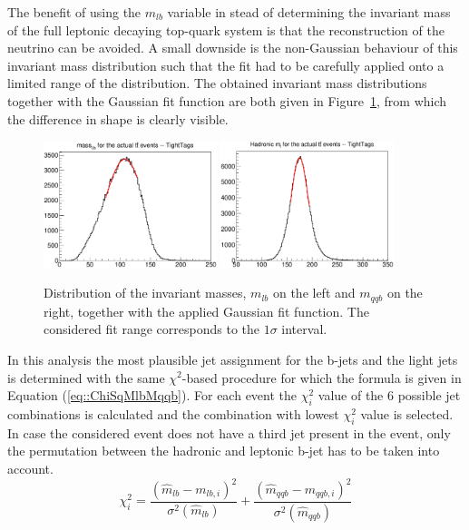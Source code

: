 The benefit of using the $m_{lb}$ variable in stead of determining the invariant mass of the full leptonic decaying top-quark system is that the reconstruction of the neutrino can be avoided.
A small downside is the non-Gaussian behaviour of this invariant mass distribution such that the fit had to be carefully applied onto a limited range of the distribution.
The obtained invariant mass distributions together with the Gaussian fit function are both given in Figure~\ref{fig::InvMasses}, from which the difference in shape is clearly visible.
\\
\begin{figure}[h!t]
 \centering
 \includegraphics[width = 0.45\textwidth]{Chapters/Chapter4_EvtSel/Figures/MlbMassDistribution.pdf} %
 \includegraphics[width = 0.45\textwidth]{Chapters/Chapter4_EvtSel/Figures/HadrMTopMassDistr.pdf} %
 \caption{Distribution of the invariant masses, $m_{lb}$ on the left and $m_{qqb}$ on the right, together with the applied Gaussian fit function. The considered fit range corresponds to the $1\sigma$ interval.} \label{fig::InvMasses}
\end{figure}

In this analysis the most plausible jet assignment for the b-jets and the light jets is determined with the same $\chi^{2}$-based procedure for which the formula is given in Equation (\ref{eq::ChiSqMlbMqqb}).
For each event the $\chi^{2}_{i}$ value of the 6 possible jet combinations is calculated and the combination with lowest $\chi^2_{i}$ value is selected.
In case the considered event does not have a third jet present in the event, only the permutation between the hadronic and leptonic b-jet has to be taken into account.
\begin{equation} \label{eq::ChiSqMlbMqqb}
 \chi^{2}_{i} = \frac{(\hat{m}_{lb} - m_{lb,i})^{2}}{\sigma^{2}(\hat{m}_{lb})} + \frac{(\hat{m}_{qqb} - m_{qqb,i})^{2}}{\sigma^{2}(\hat{m}_{qqb})}
\end{equation}


